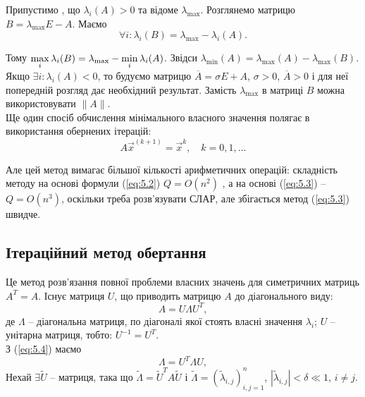 \begin{enumerate}
	Припустимо , що $\lambda_i(A) > 0$ та відоме $\lambda_{\max}$. Розглянемо матрицю $B = \lambda_{\max} E - A$. Маємо \[ \forall i: \lambda_i(B) = \lambda_{\max} - \lambda_i(A). \]

	Тому $\displaystyle\max\limits_i \lambda_i (B) = \lambda_{\max} - \displaystyle\min\limits_i \lambda_i(A)$. Звідси $\lambda_{\min}(A) = \lambda_{\max}(A) - \lambda_{\max}(B)$. \\

	Якщо $\exists i: \lambda_i(A) < 0$, то будуємо матрицю $ \overline{A} = \sigma E + A$, $\sigma > 0$, $\overline{A} > 0$ і для неї попередній розгляд дає необхідний результат. Замість $\lambda_{\max}$ в матриці $B$ можна використовувати $\|A\|$. \\

	Ще один спосіб обчислення мінімального власного значення полягає в використання обернених ітерацій:
	\begin{equation}
		\label{eq:5.3}
		A \vec x^{(k+1)} = \vec x^k, \quad k = 0, 1, \ldots
	\end{equation}

	Але цей метод вимагає більшої кількості арифметичних операцій: складність методу на основі формули (\ref{eq:5.2}) $Q = O(n^2)$ , а на основі (\ref{eq:5.3}) -- $Q = O(n^3)$, оскільки треба розв'язувати СЛАР, але збігається метод (\ref{eq:5.3}) швидче.
\end{enumerate}

\subsection{Ітераційний метод обертання}
Це метод розв'язання повної проблеми власних значень для симетричних матриць $A^T = A$. Існує матриця $U$, що приводить матрицю $A$ до діагонального виду:
\begin{equation}
	\label{eq:5.4}
	A = U \Lambda U^T,
\end{equation}
де $\Lambda$ -- діагональна матриця, по діагоналі якої стоять власні значення $\lambda_i$; $U$ -- унітарна матриця, тобто: $U^{-1}=U^T$. \\

З (\ref{eq:5.4}) маємо
\begin{equation}
	\label{eq:5.5}
	\Lambda = U^T \Lambda U,
\end{equation}
Нехай $\exists \tilde U$ -- матриця, така що $\tilde \Lambda = \tilde U^T A \tilde U$ і $\tilde \Lambda = (\tilde \lambda_{i,j})_{i,j=1}^n$, $|\tilde \lambda_{i,j}| < \delta \ll 1$, $i \ne j$. \\

